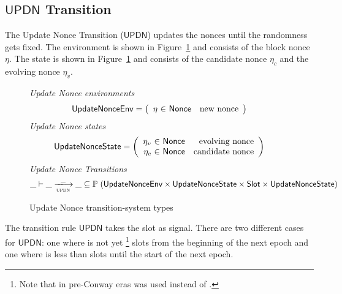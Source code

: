 \subsection{$\mathsf{UPDN}$ Transition}
\label{sec:update-nonces-trans}

The Update Nonce Transition ($\mathsf{UPDN}$) updates the nonces until the randomness gets fixed.
The environment is shown in Figure~\ref{fig:ts-types:updnonce} and consists of
the block nonce $\eta$.
The state is shown in Figure~\ref{fig:ts-types:updnonce} and consists of
the candidate nonce $\eta_c$ and the evolving nonce $\eta_v$.

\begin{figure}
  \emph{Update Nonce environments}
  \begin{equation*}
    \UpdateNonceEnv =
    \left(
      \begin{array}{r@{~\in~}lr}
        \eta & \Nonce & \text{new nonce} \\
      \end{array}
    \right)
  \end{equation*}
  \emph{Update Nonce states}
  \begin{equation*}
    \UpdateNonceState =
    \left(
      \begin{array}{r@{~\in~}lr}
        \eta_v & \Nonce & \text{evolving nonce} \\
        \eta_c & \Nonce & \text{candidate nonce} \\
      \end{array}
    \right)
  \end{equation*}
  \emph{Update Nonce Transitions}
  \begin{equation*}
    \_ \vdash \var{\_} \trans{updn}{\_} \var{\_} \subseteq
    \powerset (\UpdateNonceEnv
               \times \UpdateNonceState
               \times \Slot
               \times \UpdateNonceState
              )
  \end{equation*}
  \caption{Update Nonce transition-system types}
  \label{fig:ts-types:updnonce}
\end{figure}

The transition rule $\mathsf{UPDN}$ takes the slot  as signal. There are
two different cases for $\mathsf{UPDN}$: one where  is not yet
\RandomnessStabilisationWindow{}\footnote{Note that in pre-Conway eras \StabilityWindow{}
was used instead of \RandomnessStabilisationWindow{}.} slots from the beginning
of the next epoch and one where  is less than \RandomnessStabilisationWindow{}
slots until the start of the next epoch.

